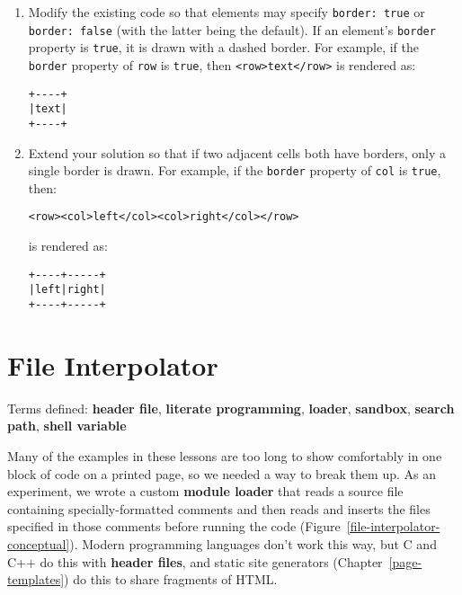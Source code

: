 \documentclass[krantzl]{krantz}
\newcommand{\chapref}[1]{Chapter~\ref{#1}}
\newcommand{\figref}[1]{Figure~\ref{#1}}
\newcommand{\glossref}[1]{\textbf{#1}}
\begin{document}
\begin{enumerate}

\item 

Modify the existing code so that elements may specify \texttt{border: true} or \texttt{border: false}
    (with the latter being the default).
    If an element’s \texttt{border} property is \texttt{true},
    it is drawn with a dashed border.
    For example,
    if the \texttt{border} property of \texttt{row} is \texttt{true},
    then \texttt{<row>text</row>} is rendered as:

\begin{lstlisting}[frame=tblr]
+----+
|text|
+----+
\end{lstlisting}



\item 

Extend your solution so that if two adjacent cells both have borders,
    only a single border is drawn.
    For example,
    if the \texttt{border} property of \texttt{col} is \texttt{true},
    then:

\begin{lstlisting}[frame=tblr]
<row><col>left</col><col>right</col></row>
\end{lstlisting}


\noindent is rendered as:

\begin{lstlisting}[frame=tblr]
+----+-----+
|left|right|
+----+-----+
\end{lstlisting}



\end{enumerate}

\chapter{File Interpolator}\label{file-interpolator}


\noindent 
  Terms defined: \glossref{header file}, \glossref{literate programming}, \glossref{loader}, \glossref{sandbox}, \glossref{search path}, \glossref{shell variable}



Many of the examples in these lessons are too long
to show comfortably in one block of code on a printed page,
so we needed a way to break them up.
As an experiment,
we wrote a custom \glossref{module loader}
that reads a source file containing specially-formatted comments
and then reads and inserts the files specified in those comments
before running the code
(\figref{file-interpolator-conceptual}).
Modern programming languages don’t work this way,
but C and C++ do this
with \glossref{header files},
and static site generators
(\chapref{page-templates}) do this to share fragments of HTML.
\end{document}
